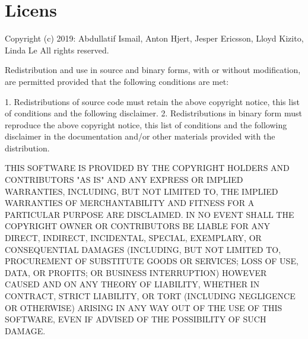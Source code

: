 \section{Licens}
\label{ref:licens}
Copyright (c) 2019: Abdullatif Ismail, Anton Hjert, Jesper Ericsson, Lloyd Kizito, Linda Le
All rights reserved.

Redistribution and use in source and binary forms, with or without
modification, are permitted provided that the following conditions are met:

1. Redistributions of source code must retain the above copyright notice, this list of conditions and the following disclaimer.
2. Redistributions in binary form must reproduce the above copyright notice, this list of conditions and the following disclaimer in the documentation and/or other materials provided with the distribution.

THIS SOFTWARE IS PROVIDED BY THE COPYRIGHT HOLDERS AND CONTRIBUTORS "AS IS" AND ANY EXPRESS OR IMPLIED WARRANTIES, INCLUDING,
BUT NOT LIMITED TO, THE IMPLIED WARRANTIES OF MERCHANTABILITY AND FITNESS FOR A PARTICULAR PURPOSE ARE DISCLAIMED. IN NO EVENT
SHALL THE COPYRIGHT OWNER OR CONTRIBUTORS BE LIABLE FOR ANY DIRECT, INDIRECT, INCIDENTAL, SPECIAL, EXEMPLARY, OR CONSEQUENTIAL
DAMAGES (INCLUDING, BUT NOT LIMITED TO, PROCUREMENT OF SUBSTITUTE GOODS OR SERVICES; LOSS OF USE, DATA, OR PROFITS; OR BUSINESS
INTERRUPTION) HOWEVER CAUSED AND ON ANY THEORY OF LIABILITY, WHETHER IN CONTRACT, STRICT LIABILITY, OR TORT (INCLUDING
NEGLIGENCE OR OTHERWISE) ARISING IN ANY WAY OUT OF THE USE OF THIS SOFTWARE, EVEN IF ADVISED OF THE POSSIBILITY OF SUCH DAMAGE.
